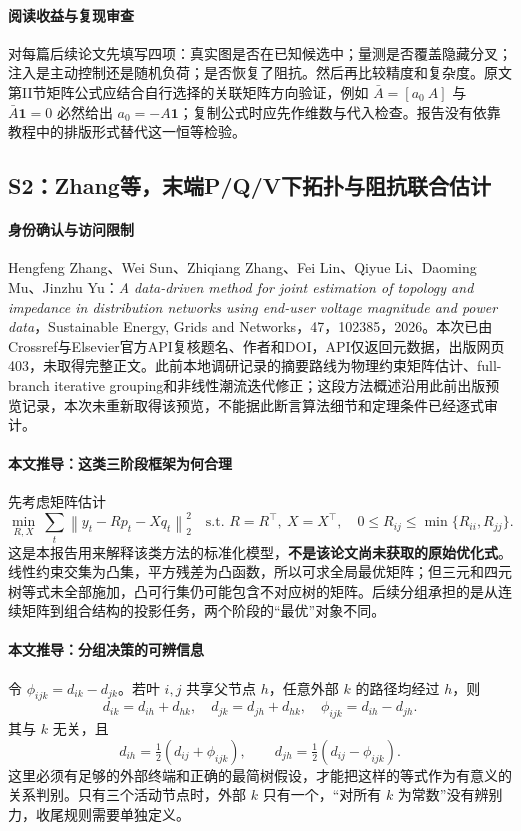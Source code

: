 \documentclass[UTF8,11pt,fontset=fandol]{ctexart}
\newcommand{\norm}[1]{\left\lVert#1\right\rVert}
\theoremstyle{remark}
\numberwithin{equation}{section}
\begin{document}
\paragraph{阅读收益与复现审查}
对每篇后续论文先填写四项：真实图是否在已知候选中；量测是否覆盖隐藏分叉；注入是主动控制还是随机负荷；是否恢复了阻抗。然后再比较精度和复杂度。原文第II节矩阵公式应结合自行选择的关联矩阵方向验证，例如 $\bar A=[a_0\ A]$ 与 $\bar A\mathbf1=0$ 必然给出 $a_0=-A\mathbf1$；复制公式时应先作维数与代入检查。报告没有依靠教程中的排版形式替代这一恒等检验。

\subsection{S2：Zhang等，末端P/Q/V下拓扑与阻抗联合估计}
\paragraph{身份确认与访问限制}
Hengfeng Zhang、Wei Sun、Zhiqiang Zhang、Fei Lin、Qiyue Li、Daoming Mu、Jinzhu Yu：\emph{A data-driven method for joint estimation of topology and impedance in distribution networks using end-user voltage magnitude and power data}，Sustainable Energy, Grids and Networks，47，102385，2026\citep{S2}。本次已由Crossref与Elsevier官方API复核题名、作者和DOI，API仅返回元数据，出版网页403，未取得完整正文。此前本地调研记录的摘要路线为物理约束矩阵估计、full-branch iterative grouping和非线性潮流迭代修正；这段方法概述沿用此前出版预览记录，本次未重新取得该预览，不能据此断言算法细节和定理条件已经逐式审计。

\paragraph{本文推导：这类三阶段框架为何合理}
先考虑矩阵估计
\begin{equation}
 \min_{R,X}\ \sum_t\norm{y_t-Rp_t-Xq_t}_2^2
 \quad\text{s.t. }R=R^\top,\ X=X^\top,\quad
 0\leq R_{ij}\leq\min\{R_{ii},R_{jj}\}.
 \label{eq:s2-illustrative-qp}
\end{equation}
这是本报告用来解释该类方法的标准化模型，\textbf{不是该论文尚未获取的原始优化式}。线性约束交集为凸集，平方残差为凸函数，所以可求全局最优矩阵；但三元和四元树等式未全部施加，凸可行集仍可能包含不对应树的矩阵。后续分组承担的是从连续矩阵到组合结构的投影任务，两个阶段的“最优”对象不同。

\paragraph{本文推导：分组决策的可辨信息}
令 $\phi_{ijk}=d_{ik}-d_{jk}$。若叶 $i,j$ 共享父节点 $h$，任意外部 $k$ 的路径均经过 $h$，则
\begin{equation}
 d_{ik}=d_{ih}+d_{hk},\quad d_{jk}=d_{jh}+d_{hk},
 \quad\phi_{ijk}=d_{ih}-d_{jh}.
\end{equation}
其与 $k$ 无关，且
\begin{equation}
 d_{ih}=\tfrac12(d_{ij}+\phi_{ijk}),\qquad
 d_{jh}=\tfrac12(d_{ij}-\phi_{ijk}).
\end{equation}
这里必须有足够的外部终端和正确的最简树假设，才能把这样的等式作为有意义的关系判别。只有三个活动节点时，外部 $k$ 只有一个，“对所有 $k$ 为常数”没有辨别力，收尾规则需要单独定义。
\end{document}
